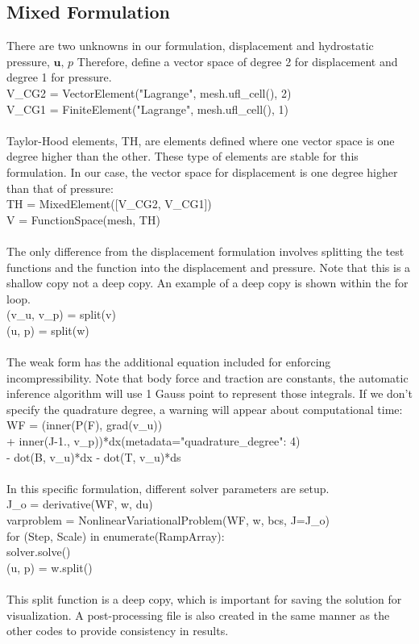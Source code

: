 \documentclass[12pt,3p]{article}
\begin{document}
\subsection{Mixed Formulation}
\vspace{-1ex}
There are two unknowns in our formulation, displacement and hydrostatic pressure, $\mathbf{u}, \, p$ Therefore, define a vector space of degree 2 for displacement and degree 1 for pressure. \\
{\selectfont
V\_CG2 = VectorElement("Lagrange", mesh.ufl\_cell(), 2) \\
V\_CG1 = FiniteElement("Lagrange", mesh.ufl\_cell(), 1) \\ \\
}
Taylor-Hood elements, {\selectfont TH}, are elements defined where one vector space is one degree higher than the other. These type of elements are stable for this formulation. In our case, the vector space for displacement is one degree higher than that of pressure: \\ 
{\selectfont
TH = MixedElement([V\_CG2, V\_CG1]) \\
V  = FunctionSpace(mesh, TH) \\ \\
}
The only difference from the displacement formulation involves splitting the test functions and the function into the displacement and pressure. Note that this is a shallow copy not a deep copy. An example of a deep copy is shown within the for loop.\\
{\selectfont
(v\_u, v\_p) = split(v) \\
(u, p) = split(w) \\ \\
}
The weak form has the additional equation included for enforcing incompressibility. Note that body force and traction are constants, the automatic inference algorithm will use 1 Gauss point to represent those integrals. If we don't specify the quadrature degree, a warning will appear about computational time: \\ 
{\selectfont
WF = (inner(P(F), grad(v\_u)) \\
\indent \indent + inner(J-1., v\_p))*dx(metadata={"quadrature\_degree": 4}) \\
\indent \indent - dot(B, v\_u)*dx - dot(T, v\_u)*ds \\ \\
}
In this specific formulation, different solver parameters are setup. \\
{\selectfont
J\_o = derivative(WF, w, du) \\
varproblem = NonlinearVariationalProblem(WF, w, bcs, J=J\_o) \\
for (Step, Scale) in enumerate(RampArray): \\
\indent     solver.solve() \\
\indent     (u, p) = w.split() \\ \\
}
This split function is a deep copy, which is important for saving the solution for visualization. A post-processing file is also created in the same manner as the other codes to provide consistency in results. 
\end{document}
